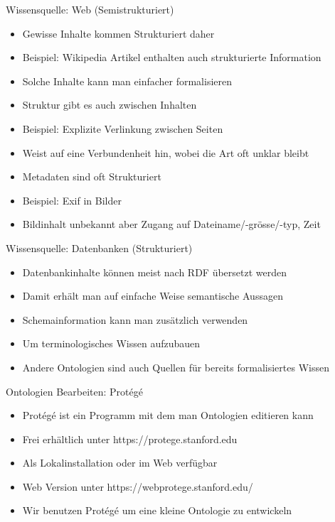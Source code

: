 \documentclass{beamer}
\begin{document}
\begin{frame}{Wissensquelle: Web (Semistrukturiert)}
	
	\begin{itemize}
		\item Gewisse Inhalte kommen Strukturiert daher
		\item Beispiel: Wikipedia Artikel enthalten auch strukturierte Information
		\item Solche Inhalte kann man einfacher formalisieren
		\item Struktur gibt es auch zwischen Inhalten
		\item Beispiel: Explizite Verlinkung zwischen Seiten
		\item Weist auf eine Verbundenheit hin, wobei die Art oft unklar bleibt
		\item Metadaten sind oft Strukturiert
		\item Beispiel: Exif in Bilder
		\item Bildinhalt unbekannt aber Zugang auf Dateiname/-grösse/-typ, Zeit
	\end{itemize}
	
\end{frame}

\begin{frame}{Wissensquelle: Datenbanken (Strukturiert)}
	
	\begin{itemize}
		\item Datenbankinhalte können meist nach RDF übersetzt werden
		\item Damit erhält man auf einfache Weise semantische Aussagen
		\item Schemainformation kann man zusätzlich verwenden
		\item Um terminologisches Wissen aufzubauen
		\item Andere Ontologien sind auch Quellen für bereits formalisiertes Wissen
	\end{itemize}
	
\end{frame}

\begin{frame}{Ontologien Bearbeiten: Prot{\'e}g{\'e}}
	
	\begin{itemize}
		\item Prot{\'e}g{\'e} ist ein Programm mit dem man Ontologien editieren kann
		\item Frei erhältlich unter https://protege.stanford.edu
		\item Als Lokalinstallation oder im Web verfügbar
		\item Web Version unter https://webprotege.stanford.edu/
		\item Wir benutzen Prot{\'e}g{\'e} um eine kleine Ontologie zu entwickeln
	\end{itemize}
	
\end{frame}
\end{document}
